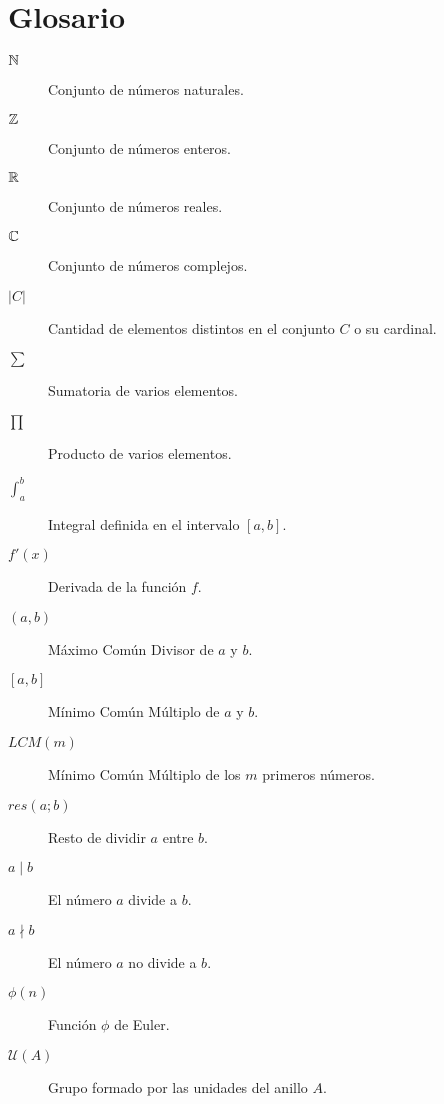 
\chapter*{Glosario}

\begin{description}
	\item[$\mathbb{N}$] Conjunto de números naturales.
	
	\item[$\mathbb{Z}$] Conjunto de números enteros.
	
	\item[$\mathbb{R}$] Conjunto de números reales.
	
	\item[$\mathbb{C}$] Conjunto de números complejos.
	
	\item[$|C|$] Cantidad de elementos distintos en el conjunto $C$ o su cardinal.
	
	\item[$\sum$] Sumatoria de varios elementos.
	
	\item[$\prod$] Producto de varios elementos.
	
	\item[$\int_{a}^{b}$] Integral definida en el intervalo $[a, b]$.
	
	\item[$f'(x)$] Derivada de la función $f$.
	
	\item[$(a, b)$] Máximo Común Divisor de $a$ y $b$.
	
	\item[${[a, b]}$] Mínimo Común Múltiplo de $a$ y $b$.
	
	\item[$LCM(m)$] Mínimo Común Múltiplo de los $m$ primeros números.
	
	\item[$res(a; b)$] Resto de dividir $a$ entre $b$.
	
	\item[$a\mid b$] El número $a$ divide a $b$.
	
	\item[$a\nmid b$] El número $a$ no divide a $b$.
	
	\item[$\phi(n)$] Función $\phi$ de Euler.
	
	\item[$\mathcal{U}(A)$] Grupo formado por las unidades del anillo $A$.
	

\end{description}
